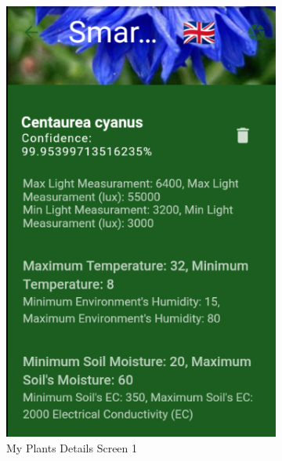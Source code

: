 \documentclass[a4paper,12pt]{report}
\begin{document}
\begin{figure}[H]
\begin{subfigure}{0.3\textwidth}
		\includegraphics[width=\textwidth]{./images/my_plants/my_plants_details_screen.png}
		\caption{My Plants Details Screen 1}
		\label{fig:my_plants1}
	\end{subfigure}
	\hfill
	\begin{subfigure}{0.3\textwidth}

\end{subfigure}
\end{figure}
\end{document}

